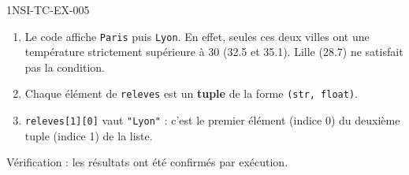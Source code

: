\begin{corrige}{1NSI-TC-EX-005}
\begin{enumerate}
  \item Le code affiche \lstinline{Paris} puis \lstinline{Lyon}. En effet, seules ces deux villes ont une température strictement supérieure à 30 (32.5 et 35.1). Lille (28.7) ne satisfait pas la condition.

  \item Chaque élément de \lstinline{releves} est un \textbf{tuple} de la forme \lstinline{(str, float)}.

  \item \lstinline{releves[1][0]} vaut \lstinline{"Lyon"} : c'est le premier élément (indice 0) du deuxième tuple (indice 1) de la liste.
\end{enumerate}

Vérification : les résultats ont été confirmés par exécution.
\end{corrige}
